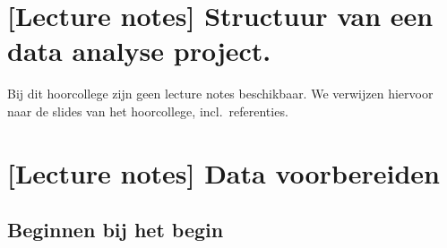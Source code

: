 \documentclass[]{tufte-book}
\begin{document}
\hypertarget{lecture-notes-structuur-van-een-data-analyse-project.}{%
\chapter{{[}Lecture notes{]} Structuur van een data analyse project.}\label{lecture-notes-structuur-van-een-data-analyse-project.}}

Bij dit hoorcollege zijn geen lecture notes beschikbaar. We verwijzen hiervoor naar de slides van het hoorcollege, incl.~referenties.

\hypertarget{lecture-notes-data-voorbereiden}{%
\chapter{{[}Lecture notes{]} Data voorbereiden}\label{lecture-notes-data-voorbereiden}}

\hypertarget{beginnen-bij-het-begin}{%
\section{Beginnen bij het begin}\label{beginnen-bij-het-begin}}
\end{document}
